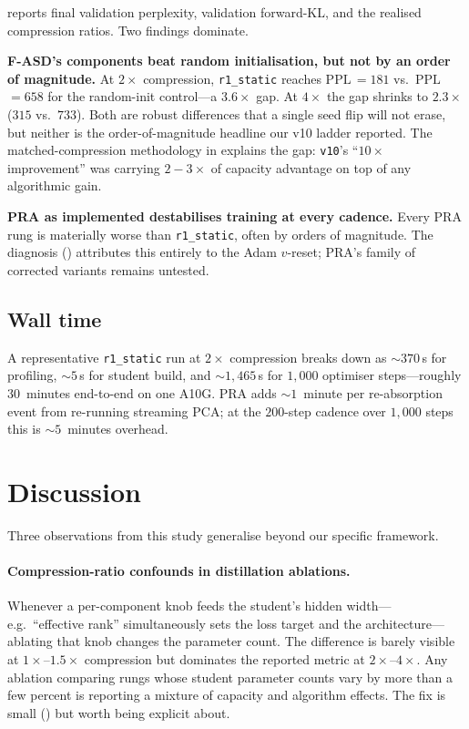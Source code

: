 \documentclass[11pt]{article}
\newcommand{\PPL}{\ensuremath{\mathrm{PPL}}}
\newcommand{\pra}{\textsc{PRA}}
\begin{document}
 reports final validation perplexity, validation forward-KL,
and the realised compression ratios. Two findings dominate.

\textbf{F-ASD's components beat random initialisation, but not by an
order of magnitude.} At $2\times$ compression, \texttt{r1\_static}
reaches \PPL{}\,$=\!181$ vs.\ \PPL{}\,$=\!658$ for the random-init
control---a $3.6\times$ gap. At $4\times$ the gap shrinks to $2.3\times$
($315$ vs.\ $733$). Both are robust differences that a single seed flip
will not erase, but neither is the order-of-magnitude headline our v10
ladder reported. The matched-compression methodology in
 explains the gap: \texttt{v10}'s ``$10\times$
improvement'' was carrying $2\!-\!3\times$ of capacity advantage on top
of any algorithmic gain.

\textbf{\pra{} as implemented destabilises training at every cadence.}
Every \pra{} rung is materially worse than \texttt{r1\_static}, often by
orders of magnitude. The diagnosis () attributes this
entirely to the Adam $v$-reset; \pra{}'s family of corrected variants
remains untested.

\subsection{Wall time}

A representative \texttt{r1\_static} run at $2\times$ compression breaks
down as $\sim\!370$\,s for profiling, $\sim\!5$\,s for student build, and
$\sim\!1{,}465$\,s for $1{,}000$ optimiser steps---roughly $30$~minutes
end-to-end on one A10G. \pra{} adds $\sim$$1$~minute per re-absorption
event from re-running streaming PCA; at the $200$-step cadence over
$1{,}000$ steps this is $\sim\!5$~minutes overhead.

\section{Discussion}
\label{sec:disc}

Three observations from this study generalise beyond our specific
framework.

\paragraph{Compression-ratio confounds in distillation ablations.}
Whenever a per-component knob feeds the student's hidden width---e.g.\
``effective rank'' simultaneously sets the loss target and the
architecture---ablating that knob changes the parameter count. The
difference is barely visible at $1\times$--$1.5\times$ compression but
dominates the reported metric at $2\times$--$4\times$. Any ablation
comparing rungs whose student parameter counts vary by more than a few
percent is reporting a mixture of capacity and algorithm effects. The
fix is small (\Cref{alg:matched}) but worth being explicit about.
\end{document}
